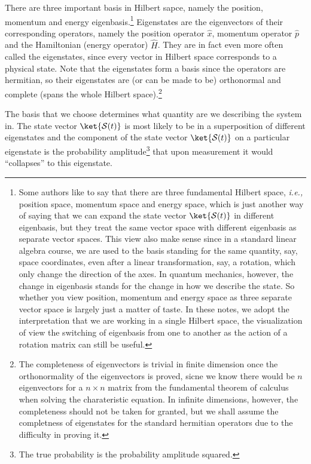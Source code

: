 \documentclass[a4paper,12pt]{report}
\begin{document}
There are three important basis in Hilbert sapce, namely the position, momentum and energy eigenbasis.\footnote{Some authors like to say that there are three fundamental Hilbert space, \textit{i.e.,} position space, momentum space and energy space, which is just another way of saying that we can expand the state vector \(\ket{\mathcal{S}(t)} \) in different eigenbasis, but they treat the same vector space with different eigenbasis as separate vector spaces. This view also make sense since in a standard linear algebra course, we are used to the basis standing for the same quantity, say, space coordinates, even after a linear transformation, say, a rotation, which only change the direction of the axes. In quantum mechanics, however, the change in eigenbasis stands for the change in how we describe the state. So whether you view position, momentum and energy space as three separate vector space is largely just a matter of taste. In these notes, we adopt the interpretation that we are working in a single Hilbert space, the visualization of view the switching of eigenbasis from one to another as the action of a rotation matrix can still be useful.} Eigenstates are the eigenvectors of their corresponding operators, namely the position operator \(\hat{x} \), momentum operator \(\hat{p} \) and the Hamiltonian (energy operator) \(\hat{H} \). They are in fact even more often called the eigenstates, since every vector in Hilbert space corresponds to a physical state. Note that the eigenstates form a basis since the operators are hermitian, so their eigenstates are (or can be made to be) orthonormal and complete (spans the whole Hilbert space).\footnote{The completeness of eigenvectors is trivial in finite dimension once the orthonormality of the eigenvectors is proved, sicne we know there would be \(n\) eigenvectors for a \(n \times n\) matrix from the fundamental theorem of calculus when solving the charateristic equation. In infinite dimensions, however, the completeness should not be taken for granted, but we shall assume the completness of eigenstates for the standard hermitian operators due to the difficulty in proving it.} 

The basis that we choose determines what quantity are we describing the system in. The state vector \(\ket{\mathcal{S}(t)} \) is most likely to be in a superposition of different eigenstates and the component of the state vector \(\ket{\mathcal{S}(t)} \) on a particular eigenstate is the probability amplitude\footnote{The true probability is the probability amplitude squared.} that upon measurement it would ``collapses'' to this eigenstate. 
\end{document}
